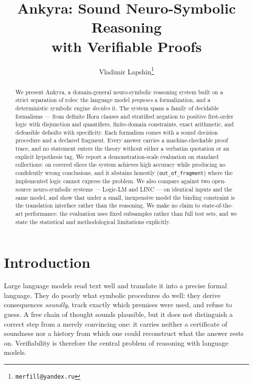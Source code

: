 \documentclass[11pt,a4paper]{article}
\title{Ankyra: Sound Neuro-Symbolic Reasoning\\
with Verifiable Proofs}
\author{Vladimir Lapshin\thanks{\texttt{merfill@yandex.ru}}}
\date{}
\begin{document}
\maketitle

\begin{abstract}
We present Ankyra, a domain-general neuro-symbolic reasoning system built on a strict
separation of roles: the language model \emph{proposes} a formalization, and a deterministic
symbolic engine \emph{decides} it. The system spans a family of decidable formalisms ---
from definite Horn clauses and stratified negation to positive first-order logic with
disjunction and quantifiers, finite-domain constraints, exact arithmetic, and defeasible
defaults with specificity. Each formalism comes with a sound decision procedure and a
declared fragment. Every answer carries a machine-checkable proof trace, and no statement
enters the theory without either a verbatim quotation or an explicit hypothesis tag. We
report a demonstration-scale evaluation on standard collections: on covered slices the
system achieves high accuracy while producing no confidently wrong conclusions, and it
abstains honestly (\texttt{out\_of\_fragment}) where the implemented logic cannot express
the problem. We also compare against two open-source neuro-symbolic systems --- Logic-LM and
LINC --- on identical inputs and the same model, and show that under a small, inexpensive
model the binding constraint is the translation interface rather than the reasoning. We make
no claim to state-of-the-art performance: the evaluation uses fixed subsamples rather than
full test sets, and we state the statistical and methodological limitations explicitly.
\end{abstract}

\section{Introduction}
\label{sec:intro}

Large language models read text well and translate it into a precise formal language. They
do poorly what symbolic procedures do well: they derive consequences \emph{soundly}, track
exactly which premises were used, and refuse to guess. A free chain of thought sounds
plausible, but it does not distinguish a correct step from a merely convincing one: it
carries neither a certificate of soundness nor a history from which one could reconstruct
what the answer rests on. Verifiability is therefore the central problem of reasoning with
language models.
\end{document}
